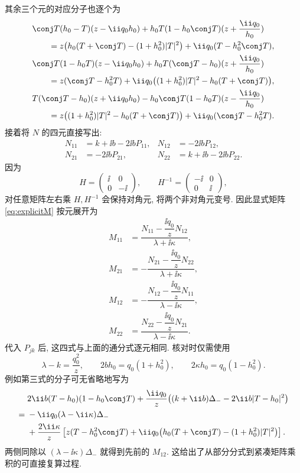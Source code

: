 其余三个元的对应分子也逐个为
\[
\begin{aligned}
&\conj T(h_0-T)(z-\ii q_0h_0)
+h_0T(1-h_0\conj T)(z+\dfrac{\ii q_0}{h_0})\\
&\qquad=z\bigl(h_0(T+\conj T)-(1+h_0^2)|T|^2\bigr)
+\ii q_0(T-h_0^2\conj T),\\
&\conj T(1-h_0T)(z-\ii q_0h_0)
+h_0T(\conj T-h_0)(z+\dfrac{\ii q_0}{h_0})\\
&\qquad=z(\conj T-h_0^2T)
+\ii q_0\bigl((1+h_0^2)|T|^2-h_0(T+\conj T)\bigr),\\
&T(\conj T-h_0)(z+\ii q_0h_0)
-h_0\conj T(1-h_0T)(z-\dfrac{\ii q_0}{h_0})\\
&\qquad=z\bigl((1+h_0^2)|T|^2-h_0(T+\conj T)\bigr)
+\ii q_0(\conj T-h_0^2T).
\end{aligned}
\]
接着将 $N$ 的四元直接写出:
\[
\begin{aligned}
N_{11}&=k+\ii b-2\ii bP_{11},&
N_{12}&=-2\ii bP_{12},\\
N_{21}&=-2\ii bP_{21},&
N_{22}&=k+\ii b-2\ii bP_{22}.
\end{aligned}
\]
因为
\[
H=\begin{pmatrix}\ii&0\\0&-\ii\end{pmatrix},\qquad
H^{-1}=\begin{pmatrix}-\ii&0\\0&\ii\end{pmatrix},
\]
对任意矩阵左右乘 $H,H^{-1}$ 会保持对角元, 将两个非对角元变号.
因此显式矩阵 \eqref{eq:explicitM} 按元展开为
\[
\begin{aligned}
M_{11}
&=\dfrac{N_{11}-\dfrac{\ii q_0}{z}N_{12}}{\lambda+\ii\kappa},\\
M_{21}
&=-\dfrac{N_{21}-\dfrac{\ii q_0}{z}N_{22}}{\lambda+\ii\kappa},\\
M_{12}
&=-\dfrac{N_{12}-\dfrac{\ii q_0}{z}N_{11}}{\lambda-\ii\kappa},\\
M_{22}
&=\dfrac{N_{22}-\dfrac{\ii q_0}{z}N_{21}}{\lambda-\ii\kappa}.
\end{aligned}
\]
代入 $P_{jk}$ 后, 这四式与上面的通分式逐元相同.
核对时仅需使用
\[
\lambda-k=\dfrac{q_0^2}{z},\qquad
2bh_0=q_0(1+h_0^2),\qquad
2\kappa h_0=q_0(1-h_0^2).
\]
例如第三式的分子可无省略地写为
\[
\begin{aligned}
&2\ii b(T-h_0)(1-h_0\conj T)
+\dfrac{\ii q_0}{z}
\bigl((k+\ii b)\Delta_--2\ii b|T-h_0|^2\bigr)\\
={}&-\ii q_0(\lambda-\ii\kappa)\Delta_-\\
&+\dfrac{2\ii\kappa}{z}
\left[
z(T-h_0^2\conj T)
+\ii q_0\bigl(h_0(T+\conj T)-(1+h_0^2)|T|^2\bigr)
\right].
\end{aligned}
\]
两侧同除以 $(\lambda-\ii\kappa)\Delta_-$ 就得到先前的 $M_{12}$.
这给出了从部分分式到紧凑矩阵乘积的可直接复算过程.

